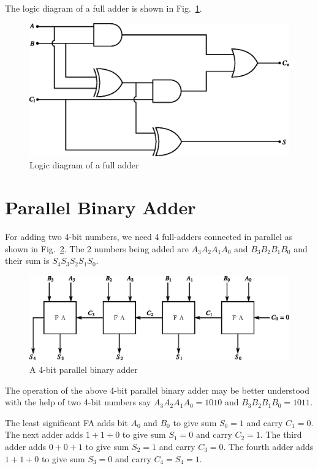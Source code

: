 \eject

The logic diagram of a full adder is shown in Fig.~\ref{fig5.28}.
\begin{figure}[H]
\centering
\includegraphics{chap5/fig5.21.eps}
\caption{Logic diagram of a full adder}\label{fig5.28}
\end{figure}

\section{Parallel Binary Adder}\label{sec5.18}

For adding two 4-bit numbers, we need 4 full-adders connected in parallel as shown in Fig.~\ref{fig5.29}. The 2 numbers being added are $A_{3}A_{2}A_{1}A_{0}$ and $B_{3}B_{2}B_{1}B_{0}$ and their sum is $S_{4}S_{3}S_{2}S_{1}S_{0}$.
\begin{figure}[H]
\centering
\includegraphics{chap5/fig5.22.eps}
\caption{A 4-bit parallel binary adder}\label{fig5.29}
\end{figure}

The operation of the above 4-bit parallel binary adder may be better understood with the help of two 4-bit numbers say $A_{3}A_{2}A_{1}A_{0}=1010$ and $B_{3}B_{2}B_{1}B_{0}=1011$.

\eject

The least significant FA adds bit $A_{0}$ and $B_{0}$ to give sum $S_{0}=1$ and carry $C_{1}=0$. The next adder adds $1+1+0$ to give sum $S_{1}=0$ and carry $C_{2}=1$. The third adder adds $0+0+1$ to give sum $S_{2}=1$ and carry $C_{3}=0$. The fourth adder adds $1+1+0$ to give sum $S_{3}=0$ and carry $C_{4}=S_{4}=1$.

